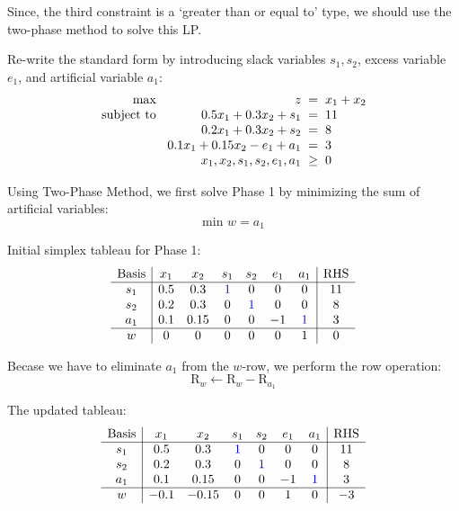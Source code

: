 \documentclass[a4paper, 10pt]{article}
\begin{document}
\begin{tosubmit}
Since, the third constraint is a `greater than or equal to' type, we should use the two-phase method to solve this LP.

\vspace{3mm}

\par\hspace{5mm} Re-write the standard form by introducing slack variables \( s_1, s_2 \), excess variable \( e_1 \), and artificial variable \( a_1 \):
\[
\begin{array}{@{\hspace{2mm}} r @{\hspace{2mm}} r @{\hspace{2mm}} c @{\hspace{2mm}} l}
    \text{max } & z & = & x_1 + x_2 \\
    \text{subject to } & 0.5x_1 + 0.3x_2 + s_1 & = & 11 \\
    & 0.2x_1 + 0.3x_2 + s_2 & = & 8 \\
    & 0.1x_1 + 0.15x_2 - e_1 + a_1 & = & 3 \\
    & x_1, x_2, s_1, s_2, e_1, a_1 & \geq & 0
\end{array}
\]

\par\hspace{5mm} Using Two-Phase Method, we first solve Phase 1 by minimizing the sum of artificial variables:
\[ \text{min } w = a_1 \]

Initial simplex tableau for Phase 1:
\[
\begin{array}{c|cccccc|c}
    \text{Basis} & x_1 & x_2 & s_1 & s_2 & e_1 & a_1 & \text{RHS} \\
    \hline
    s_1 & 0.5 & 0.3 & \textcolor[HTML]{0000FF}{1} & 0 & 0 & 0 & 11 \\
    s_2 & 0.2 & 0.3 & 0 & \textcolor[HTML]{0000FF}{1} & 0 & 0 & 8 \\
    a_1 & 0.1 & 0.15 & 0 & 0 & -1 & \textcolor[HTML]{0000FF}{1} & 3 \\
    \hline
    w & 0 & 0 & 0 & 0 & 0 & 1 & 0 \\
\end{array}
\]

Becase we have to eliminate \( a_1 \) from the \( w \)-row, we perform the row operation:
\[ \text{R}_w \leftarrow \text{R}_w - \text{R}_{a_1} \]

The updated tableau:
\[
\begin{array}{c|cccccc|c}
    \text{Basis} & x_1 & x_2 & s_1 & s_2 & e_1 & a_1 & \text{RHS} \\
    \hline
    s_1 & 0.5 & 0.3 & \textcolor[HTML]{0000FF}{1} & 0 & 0 & 0 & 11 \\
    s_2 & 0.2 & 0.3 & 0 & \textcolor[HTML]{0000FF}{1} & 0 & 0 & 8 \\
    a_1 & 0.1 & 0.15 & 0 & 0 & -1 & \textcolor[HTML]{0000FF}{1} & 3 \\
    \hline
    w & -0.1 & -0.15 & 0 & 0 & 1 & 0 & -3 \\
\end{array}
\]


\end{tosubmit}
\end{document}
